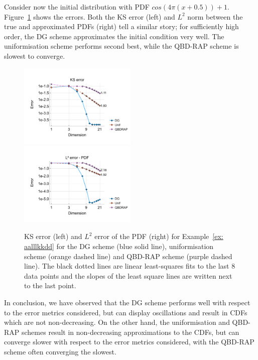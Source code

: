\begin{example}\label{ex: aalllkkdd}Consider now the initial distribution with PDF \(cos(4\pi(x+0.5))+1\). Figure~\ref{fig: fun 9 comp} shows the errors. Both the KS error (left) and \(L^2\) norm between the true and approximated PDFs (right) tell a similar story; for sufficiently high order, the DG scheme approximates the initial condition very well. The uniformisation scheme performs second best, while the QBD-RAP scheme is slowest to converge. 
\begin{figure}[h]
	\centering
	\includegraphics[width=0.5\textwidth,trim={1.1cm 0.8cm 0.1cm 1.25cm},clip]{chapter6/figs/comp/fun9/meshs_ks_error_formatted.pdf}%
	\includegraphics[width=0.5\textwidth,trim={1.1cm 0.8cm 0.1cm 1.25cm},clip]{chapter6/figs/comp/fun9/meshs_l2_pdf_error_formatted.pdf}
	\caption{KS error (left) and \(L^2\) error of the PDF (right) for Example~\ref{ex: aalllkkdd} for the DG scheme (blue solid line), uniformisation scheme (orange dashed line) and QBD-RAP scheme (purple dashed line). The black dotted lines are linear least-squares fits to the last 8 data points and the slopes of the least square lines are written next to the last point.}
	\label{fig: fun 9 comp} 
\end{figure}
\exampleFloatBarrier
\end{example}

In conclusion, we have observed that the DG scheme performs well with respect to the error metrics considered, but can display oscillations and result in CDFs which are not non-decreasing. On the other hand, the uniformisation and QBD-RAP schemes result in non-decreasing approximations to the CDFs, but can converge slower with respect to the error metrics considered, with the QBD-RAP scheme often converging the slowest.
\FloatBarrier

